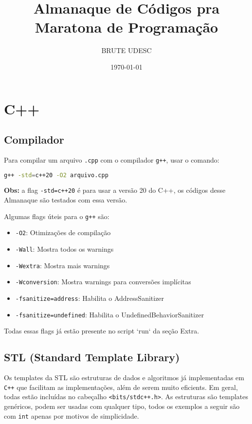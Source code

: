 \documentclass[10pt, a4paper, oneside]{book}
\title{Almanaque de Códigos pra\\Maratona de Programação}
\author{BRUTE UDESC}
\begin{document}
\twocolumn
\date{\today}
\maketitle

\renewcommand{\contentsname}{Índice} %

\tableofcontents\chapter{C++}

\section{Compilador}

Para compilar um arquivo \texttt{.cpp} com o compilador \texttt{g++}, usar o comando:

\begin{lstlisting}[language=bash]
    g++ -std=c++20 -O2 arquivo.cpp
\end{lstlisting}

\textbf{Obs:} a flag \texttt{-std=c++20} é para usar a versão 20 do C++, os códigos desse Almanaque são testados com essa versão.

Algumas flags úteis para o \texttt{g++} são:

\begin{itemize}
    \item \texttt{-O2}: Otimizações de compilação
    \item \texttt{-Wall}: Mostra todos os warnings
    \item \texttt{-Wextra}: Mostra mais warnings
    \item \texttt{-Wconversion}: Mostra warnings para conversões implícitas
    \item \texttt{-fsanitize=address}: Habilita o AddressSanitizer
    \item \texttt{-fsanitize=undefined}: Habilita o UndefinedBehaviorSanitizer
\end{itemize}

Todas essas flags já estão presente no script `run` da seção Extra.

\section{STL (Standard Template Library)}

Os templates da STL são estruturas de dados e algoritmos já implementadas em \texttt{C++} que facilitam as implementações, além de serem muito eficients.
Em geral, todas estão incluídas no cabeçalho \texttt{<bits/stdc++.h>}. As estruturas são templates genéricos, podem ser usadas com qualquer tipo, todos os exemplos a seguir são com \texttt{int} apenas por motivos de simplicidade.
\end{document}

